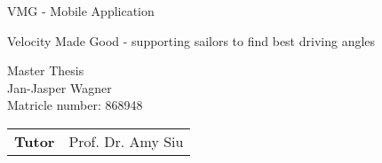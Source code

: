  

\pagestyle{empty} %



\newenvironment{conditions}
  {\par\vspace{\abovedisplayskip}\noindent
   \begin{tabular}{>{$}l<{$} @{} >{${}}c<{{}$} @{} l}}
  {\end{tabular}\par\vspace{\belowdisplayskip}}




\begin{center}
\begin{Huge}
VMG - Mobile Application\\
\end{Huge}

\begin{Large}
Velocity Made Good - supporting sailors to find best driving angles\\
\end{Large}
\vspace{8mm}
Master Thesis\\
\vspace{0.4cm}
\vspace{2 cm}
Jan-Jasper Wagner \\
Matricle number: 868948\\
\vspace{8cm}
\begin{tabular}{rl}
{\bfseries Tutor} & Prof. Dr. Amy Siu\\
\end{tabular}

\end{center}
\clearpage

\pagestyle{scrheadings}
\chead{\rightmark}  %
\cfoot{\pagemark} %

\tableofcontents %
\listoffigures %
\listoftables %

